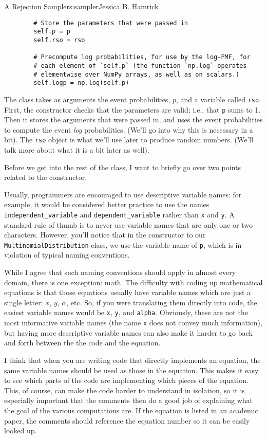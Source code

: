 \begin{aosachapter}{A Rejection Sampler}{s:sampler}{Jessica B. Hamrick}
\begin{verbatim}
        # Store the parameters that were passed in
        self.p = p
        self.rso = rso

        # Precompute log probabilities, for use by the log-PMF, for
        # each element of `self.p` (the function `np.log` operates
        # elementwise over NumPy arrays, as well as on scalars.)
        self.logp = np.log(self.p)
\end{verbatim}

The class takes as arguments the event probabilities, $p$, and a
variable called \texttt{rso}. First, the constructor checks that the
parameters are valid; i.e., that \texttt{p} sums to 1. Then it stores
the arguments that were passed in, and uses the event probabilities to
compute the event \emph{log} probabilities. (We'll go into why this is
necessary in a bit). The \texttt{rso} object is what we'll use later to
produce random numbers. (We'll talk more about what it is a bit later as
well).

Before we get into the rest of the class, I want to briefly go over two
points related to the constructor.

\label{descriptive-vs.mathematic-variable-names}

Usually, programmers are encouraged to use descriptive variable names:
for example, it would be considered better practice to use the names
\texttt{independent\_variable} and \texttt{dependent\_variable} rather
than \texttt{x} and \texttt{y}. A standard rule of thumb is to never use
variable names that are only one or two characters. However, you'll
notice that in the constructor to our \texttt{MultinomialDistribution}
class, we use the variable name of \texttt{p}, which is in violation of
typical naming conventions.

While I agree that such naming conventions should apply in almost every
domain, there is one exception: math. The difficulty with coding up
mathematical equations is that those equations usually have variable
names which are just a single letter: $x$, $y$, $\alpha$, etc. So, if
you were translating them directly into code, the easiest variable names
would be \texttt{x}, \texttt{y}, and \texttt{alpha}. Obviously, these
are not the most informative variable names (the name \texttt{x} does
not convey much information), but having more descriptive variable names
can also make it harder to go back and forth between the the code and
the equation.

I think that when you are writing code that directly implements an
equation, the same variable names should be used as those in the
equation. This makes it easy to see which parts of the code are
implementing which pieces of the equation. This, of course, can make the
code harder to understand in isolation, so it is especially important
that the comments then do a good job of explaining what the goal of the
various computations are. If the equation is listed in an academic
paper, the comments should reference the equation number so it can be
easily looked up.


\end{aosachapter}
